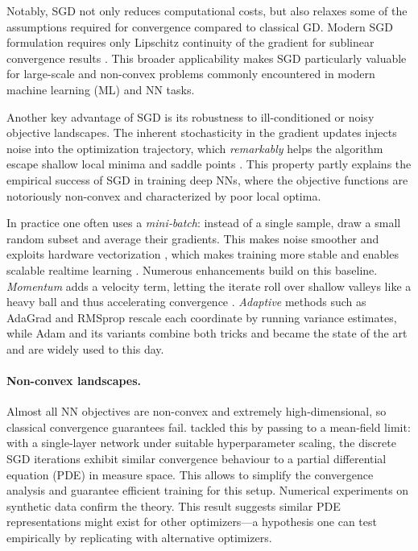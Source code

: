 \documentclass[12pt]{article}
\begin{document}
Notably, SGD not only reduces computational costs, but also relaxes some of the assumptions required for convergence compared to classical GD.
Modern SGD formulation requires only Lipschitz continuity of the gradient for sublinear convergence results \cite{bubeck2015convex, bottou2018optimization}. This broader applicability makes SGD particularly valuable for large-scale and non-convex problems commonly encountered in modern machine learning (ML) and NN tasks.

Another key advantage of SGD is its robustness to ill-conditioned or noisy objective landscapes.
The inherent stochasticity in the gradient updates injects noise into the optimization trajectory, which \emph{remarkably} helps the algorithm escape shallow local minima and saddle points \cite{ge2015escaping, jin2017escape}.
This property partly explains the empirical success of SGD in training deep NNs, where the objective functions are notoriously non-convex and characterized by poor local optima.

In practice one often uses a \emph{mini‐batch}: instead of a single sample, draw a small random subset and average their gradients.  This makes noise smoother and exploits hardware vectorization \cite{bac97}, which makes training more stable \cite{n17} and enables scalable realtime learning \cite{bottou2010large}.
Numerous enhancements build on this baseline.  \emph{Momentum} adds a velocity term, letting the iterate roll over shallow valleys like a heavy ball and thus accelerating convergence \cite{rhw86}.  \emph{Adaptive} methods such as AdaGrad \cite{dhs11} and RMSprop \cite{h20} rescale each coordinate by running variance estimates, while Adam\cite{kingma2014adam} and its variants combine both tricks and became the state of the art \cite{ndb19} and are widely used to this day.

\paragraph{Non-convex landscapes.}
Almost all NN objectives are non-convex and extremely high-dimensional, so classical convergence guarantees fail.
\cite{mmn18} tackled this by passing to a mean‐field limit: with a single‐layer network under suitable hyperparameter scaling, the discrete SGD iterations exhibit similar convergence behaviour to a partial differential equation (PDE) in measure space.
This allows to simplify the convergence analysis and guarantee efficient training for this setup.
Numerical experiments on synthetic data confirm the theory.
This result suggests similar PDE representations might exist for other optimizers---a hypothesis one can test empirically by replicating \cite{mmn18} with alternative optimizers.
\end{document}
